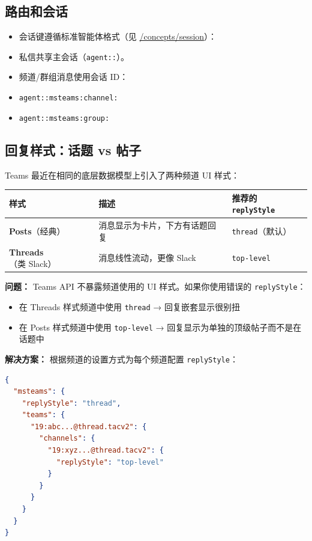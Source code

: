\subsection{路由和会话}


\begin{itemize}
  \item 会话键遵循标准智能体格式（见 \href{/concepts/session}{/concepts/session}）：
  \item 私信共享主会话（\texttt{agent::}）。
  \item 频道/群组消息使用会话 ID：
  \item \texttt{agent::msteams:channel:}
  \item \texttt{agent::msteams:group:}
\end{itemize}


\subsection{回复样式：话题 vs 帖子}


Teams 最近在相同的底层数据模型上引入了两种频道 UI 样式：


\begin{table}[h]
\centering
\small
\begin{tabular}{|l|l|l|}
\hline
样式 & 描述 & 推荐的 \texttt{replyStyle} \\
\hline
\textbf{Posts}（经典） & 消息显示为卡片，下方有话题回复 & \texttt{thread}（默认） \\
\hline
\textbf{Threads}（类 Slack） & 消息线性流动，更像 Slack & \texttt{top-level} \\
\hline
\end{tabular}
\end{table}



\textbf{问题：} Teams API 不暴露频道使用的 UI 样式。如果你使用错误的 \texttt{replyStyle}：

\begin{itemize}
  \item 在 Threads 样式频道中使用 \texttt{thread} → 回复嵌套显示很别扭
  \item 在 Posts 样式频道中使用 \texttt{top-level} → 回复显示为单独的顶级帖子而不是在话题中
\end{itemize}


\textbf{解决方案：} 根据频道的设置方式为每个频道配置 \texttt{replyStyle}：

\begin{lstlisting}[language=json]
{
  "msteams": {
    "replyStyle": "thread",
    "teams": {
      "19:abc...@thread.tacv2": {
        "channels": {
          "19:xyz...@thread.tacv2": {
            "replyStyle": "top-level"
          }
        }
      }
    }
  }
}
\end{lstlisting}



